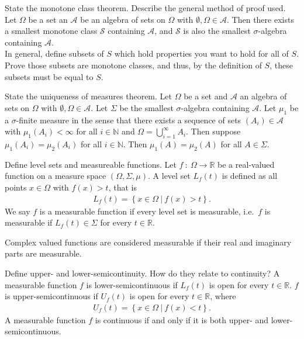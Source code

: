 \documentclass[avery5388,grid,frame]{flashcards}
\newcommand{\f}[3]{#1\ :\ #2 \rightarrow #3}
\def\Rl{\mathbb{R}}
\begin{document}
\begin{flashcard}
    {State the monotone class theorem.  Describe the general method of proof used.}
    Let $\Omega$ be a set an $\mathcal{A}$ be an algebra of sets on $\Omega$ with $\emptyset,\Omega \in \mathcal{A}$.  Then there exists a smallest monotone class $\mathcal{S}$ containing $\mathcal{A}$, and $\mathcal{S}$ is also the smallest $\sigma$-algebra containing $\mathcal{A}$. \\

    In general, define subsets of $S$ which hold properties you want to hold for all of $S$.  Prove those subsets are monotone classes, and thus, by the definition of $S$, these subsets must be equal to $S$.
\end{flashcard}

\begin{flashcard}
    {State the uniqueness of measures theorem.}
    Let $\Omega$ be a set and $\mathcal{A}$ an algebra of sets on $\Omega$ with $\emptyset,\Omega \in \mathcal{A}$.  Let $\Sigma$ be the smallest $\sigma$-algebra containing $\mathcal{A}$.  Let $\mu_1$ be a $\sigma$-finite measure in the sense that there exists a sequence of sets $(A_i) \in \mathcal{A}$ with $\mu_1(A_i) < \infty$ for all $i \in \mathbb{N}$ and $\Omega = \bigcup_{i=1}^\infty A_i$.  Then suppose $\mu_1(A_i) = \mu_2(A_i)$ for all $i \in \mathbb{N}$.  Then $\mu_1(A) = \mu_2(A)$ for all $A \in \Sigma$.
\end{flashcard}

\begin{flashcard}
    {Define level sets and measureable functions.}
    Let $\f{f}{\Omega}{\Rl}$ be a real-valued function on a measure space $(\Omega,\Sigma,\mu)$.  A level set $L_f(t)$ is defined as all points $x \in \Omega$ with $f(x) > t$, that is
    \begin{align*}
        L_f(t) = \left\{x \in \Omega\ |\ f(x) > t\right\}.
    \end{align*}
    We say $f$ is a measurable function if every level set is measurable, i.e.~$f$ is measurable if $L_f(t) \in \Sigma$ for every $t \in \Rl$.

    Complex valued functions are considered measurable if their real and imaginary parts are measurable.
\end{flashcard}

\begin{flashcard}
    {Define upper- and lower-semicontinuity.  How do they relate to continuity?}
    A measurable function $f$ is lower-semicontinuous if $L_f(t)$ is open for every $t \in \Rl$.  $f$ is upper-semicontinuous if $U_f(t)$ is open for every $t \in \Rl$, where
    \begin{align*}
        U_f(t) = \left\{x \in \Omega\ |\ f(x) < t\right\}.
    \end{align*}
    A measurable function $f$ is continuous if and only if it is both upper- and lower-semicontinuous.
\end{flashcard}
\end{document}
